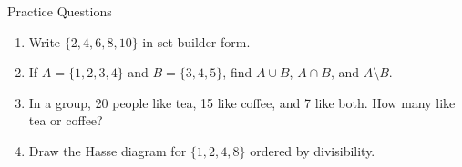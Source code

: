 \documentclass[aspectratio=169,11pt]{beamer}
\begin{document}
\begin{frame}{Practice Questions}
\begin{enumerate}
  \item Write \(\{2,4,6,8,10\}\) in set-builder form.
  \item If \(A=\{1,2,3,4\}\) and \(B=\{3,4,5\}\), find
        \(A\cup B\), \(A\cap B\), and \(A\setminus B\).
  \item In a group, 20 people like tea, 15 like coffee, and 7 like both.
        How many like tea or coffee?
  \item Draw the Hasse diagram for \(\{1,2,4,8\}\) ordered by divisibility.
\end{enumerate}
\end{frame}
\end{document}
